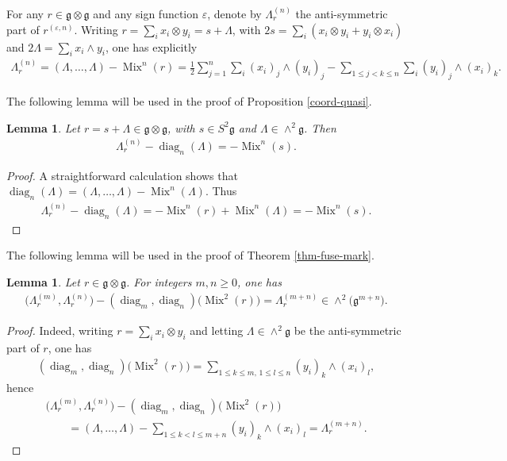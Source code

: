 \documentclass[10pt,a4paper]{amsart}
\numberwithin{equation}{section}
\newtheorem{Lemma}[Theorem]{Lemma}
\def \g {\mathfrak{a}}
\def \g {\mathfrak{g}}
\DeclareMathOperator{\diag}{diag}
\DeclareMathOperator{\Mix}{Mix}
\begin{document}
For any $r \in \g \otimes \g$ and any sign function $\varepsilon$, denote by $\Lambda_r^{(n)}$ the anti-symmetric part of $r^{(\varepsilon, n)}$. Writing $r = \sum_i x_i \otimes y_i = s + \Lambda$, with $2s = \sum_i (x_i \otimes y_i + y_i \otimes x_i)$ and $2\Lambda = \sum_i x_i \wedge y_i$, one has explicitly
\begin{gather*}
\Lambda_r^{(n)} = (\Lambda, \ldots, \Lambda) - \Mix^n(r) = \frac{1}{2} \sum_{j=1}^n \sum_i (x_i)_j \wedge (y_i)_j - \sum_{1 \leq j < k \leq n} \sum_i (y_i)_j \wedge (x_i)_k. %
\end{gather*}

The following lemma will be used in the proof of Proposition \ref{coord-quasi}.

\begin{Lemma} \label{lem-diag_nLambda}
Let $r = s + \Lambda \in \g \otimes \g$, with $s \in S^2 \g$ and $\Lambda \in \wedge^2 \g$. Then
\begin{gather*}
\Lambda_r^{(n)} - \diag_n(\Lambda) = - \Mix^n(s). %
\end{gather*}
\end{Lemma}
\begin{proof}
A straightforward calculation shows that $\diag_n(\Lambda) = (\Lambda, \ldots, \Lambda) - \Mix^n(\Lambda)$. Thus
\begin{gather*}
\Lambda_r^{(n)} - \diag_n(\Lambda) = - \Mix^n(r) + \Mix^n(\Lambda) = - \Mix^n(s).\tag*{\qed}
\end{gather*}\renewcommand{\qed}{}
\end{proof}

The following lemma will be used in the proof of Theorem \ref{thm-fuse-mark}.

\begin{Lemma} \label{lem-mix^2}
Let $r\in \g \otimes \g$. For integers $m,n \geq 0$, one has
\begin{gather*}
\big(\Lambda_r^{(m)}, \Lambda_r^{(n)}\big) - (\diag_m, \diag_n)\big(\Mix^2(r)\big) = \Lambda_r^{(m+n)} \in \wedge^2 \big(\g^{m+n}\big).
\end{gather*}
\end{Lemma}
\begin{proof}
Indeed, writing $r = \sum_i x_i \otimes y_i$ and letting $\Lambda \in \wedge^2 \g$ be the anti-symmetric part of $r$, one has
\begin{gather*}
(\diag_m, \diag_n)\big(\Mix^2(r)\big) = \sum_{1 \leq k \leq m, \, 1 \leq l \leq n} (y_i)_k \wedge (x_i)_l,
\end{gather*}
hence
\begin{gather*}
\big(\Lambda_r^{(m)}, \Lambda_r^{(n)}\big) - (\diag_m, \diag_n)\big(\Mix^2(r)\big) \\
\qquad{} = (\Lambda, \ldots, \Lambda) - \sum_{1 \leq k < l \leq m+n} (y_i)_k \wedge (x_i)_l = \Lambda_r^{(m+n)}.\tag*{\qed}
\end{gather*}\renewcommand{\qed}{}
\end{proof}
\end{document}
